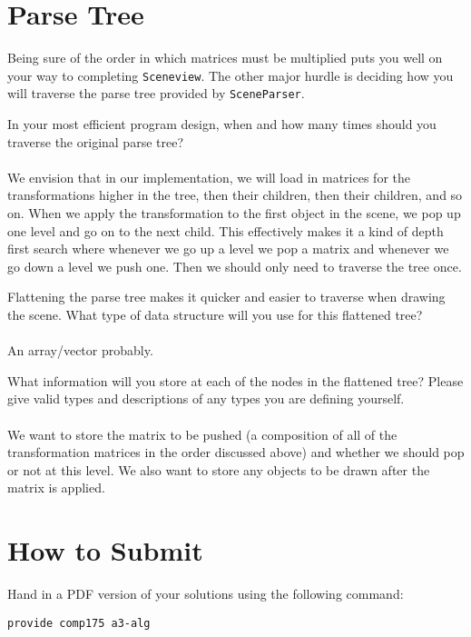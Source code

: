 \documentclass[10pt,twocolumn]{article}
\begin{document}
\section{Parse Tree}
Being sure of the order in which matrices must be multiplied puts you well on your way to completing {\tt Sceneview}. The other major hurdle is deciding how you will traverse the parse tree provided by {\tt SceneParser}.
\begin{framed}
\noindent {\bf [1 point]} In your most efficient program design, when and how many times should you traverse the original parse tree?\\ \\
We envision that in our implementation, we will load in matrices for the transformations higher in the tree, then their children, then their children, and so on. When we apply the transformation to the first object in the scene, we pop up one level and go on to the next child. This effectively makes it a kind of depth first search where whenever we go up a level we pop a matrix and whenever we go down a level we push one. Then we should only need to traverse the tree once. 
\end{framed}
\begin{framed}
\noindent {\bf [1 point]} Flattening the parse tree makes it quicker and easier to traverse when drawing the scene. What type of data structure will you use for this flattened tree?\\ \\
An array/vector probably.
\end{framed}
\begin{framed}
\noindent {\bf [1 point]} What information will you store at each of the nodes in the flattened tree? Please give valid types and descriptions of any types you are defining yourself.\\ \\
We want to store the matrix to be pushed (a composition of all of the transformation matrices in the order discussed above) and whether we should pop or not at this level. We also want to store any objects to be drawn after the matrix is applied.
\end{framed}
\section{How to Submit}

Hand in a PDF version of your solutions using the following command:
\begin{center}
 {\tt provide comp175 a3-alg}
 \end{center}
\end{document}
